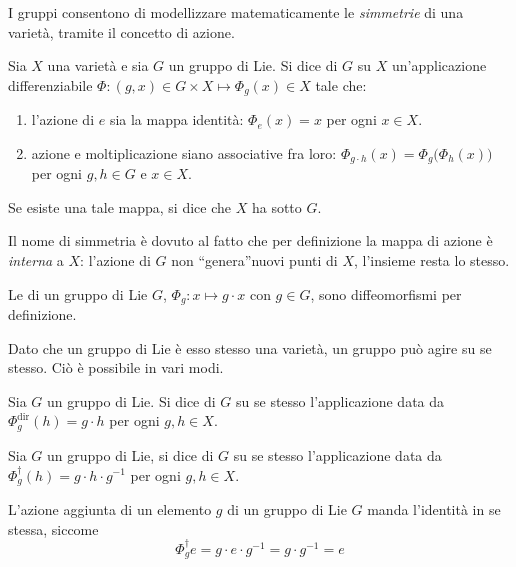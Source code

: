 I gruppi consentono di modellizzare matematicamente le \emph{simmetrie} di una varietà, tramite il concetto di azione.
\begin{definition}
  Sia $X$ una varietà e sia $G$ un gruppo di Lie. Si dice  di $G$ su $X$ un'applicazione differenziabile $\Phi:(g,x) \in G \times X \mapsto \Phi_g(x) \in X$ tale che:
  \begin{enumerate}
    \item l'azione di $e$ sia la mappa identità: $\Phi_e (x) = x$ per ogni $x \in X$.
    \item azione e moltiplicazione siano associative fra loro: $\Phi_{g\cdot h} (x) = \Phi_g \big(\Phi_h (x)\big)$ per ogni $g,h \in G$ e $x \in X$.
  \end{enumerate}
Se esiste una tale mappa, si dice che $X$ ha  sotto $G$. 
\end{definition}
\begin{remark}
  Il nome di simmetria è dovuto al fatto che per definizione la mappa di azione è \emph{interna} a $X$: l'azione di $G$ non \textquotedblleft genera\textquotedblright nuovi punti di $X$, l'insieme resta lo stesso.
\end{remark}
\begin{remark}
  Le  di un gruppo di Lie $G$, $\Phi_g: x \mapsto g\cdot x$ con $g \in G$, sono diffeomorfismi per definizione.
\end{remark}

Dato che un gruppo di Lie è esso stesso una varietà, un gruppo può agire su se stesso. Ciò è possibile in vari modi.

\begin{definition}
  Sia $G$ un gruppo di Lie. Si dice  di $G$ su se stesso l'applicazione data da $\Phi^{\text{dir}}_g(h) = g \cdot h$ per ogni $g,h \in X$.
\end{definition}
\begin{definition}
  Sia $G$ un gruppo di Lie, si dice  di $G$ su se stesso l'applicazione data da $\Phi^{\dagger}_g(h) = g \cdot h \cdot g^{-1}$ per ogni $g,h \in X$.
\end{definition}
\begin{remark} \label{rem:adjIdentity}
  L'azione aggiunta di un elemento $g$ di un gruppo di Lie $G$ manda l'identità in se stessa, siccome \begin{equation*}
  \Phi^{\dagger}_g e = g\cdot e\cdot g^{-1} = g\cdot g^{-1} = e
  \end{equation*} 
\end{remark}

